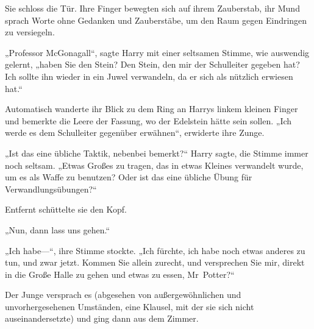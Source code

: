 
Sie schloss die Tür. Ihre Finger bewegten sich auf ihrem Zauberstab, ihr Mund sprach Worte ohne Gedanken und Zauberstäbe, um den Raum gegen Eindringen zu versiegeln.

„Professor McGonagall“, sagte Harry mit einer seltsamen Stimme, wie auswendig gelernt, „haben Sie den Stein? Den Stein, den mir der Schulleiter gegeben hat? Ich sollte ihn wieder in ein Juwel verwandeln, da er sich als nützlich erwiesen hat.“

Automatisch wanderte ihr Blick zu dem Ring an Harrys linkem kleinen Finger und bemerkte die Leere der Fassung, wo der Edelstein hätte sein sollen. „Ich werde es dem Schulleiter gegenüber erwähnen“, erwiderte ihre Zunge.

„Ist das eine übliche Taktik, nebenbei bemerkt?“ Harry sagte, die Stimme immer noch seltsam. „Etwas Großes zu tragen, das in etwas Kleines verwandelt wurde, um es als Waffe zu benutzen? Oder ist das eine übliche Übung für Verwandlungsübungen?“

Entfernt schüttelte sie den Kopf.

„Nun, dann lass uns gehen.“

„Ich habe—“, ihre Stimme stockte. „Ich fürchte, ich habe noch etwas anderes zu tun, und zwar jetzt. Kommen Sie allein zurecht, und versprechen Sie mir, direkt in die Große Halle zu gehen und etwas zu essen, Mr~Potter?“

Der Junge versprach es (abgesehen von außergewöhnlichen und unvorhergesehenen Umständen, eine Klausel, mit der sie sich nicht auseinandersetzte) und ging dann aus dem Zimmer.


